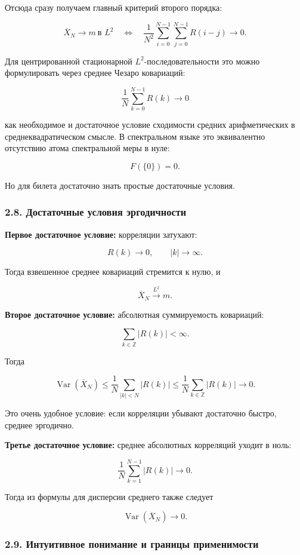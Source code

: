 \documentclass[
  11pt,
  a4paper,
]{article}
\begin{document}
Отсюда сразу получаем главный критерий второго порядка:

\[
\overline X_N\to m\ \text{в }L^2
\quad\Longleftrightarrow\quad
\frac1{N^2}
\sum_{i=0}^{N-1}\sum_{j=0}^{N-1}R(i-j)\to0.
\]

Для центрированной стационарной \(L^2\)-последовательности это можно
формулировать через среднее Чезаро ковариаций:

\[
\frac1N\sum_{k=0}^{N-1}R(k)\to0
\]

как необходимое и достаточное условие сходимости средних арифметических
в среднеквадратическом смысле. В спектральном языке это эквивалентно
отсутствию атома спектральной меры в нуле:

\[
F(\{0\})=0.
\]

Но для билета достаточно знать простые достаточные условия.

\subsubsection{2.8. Достаточные условия
эргодичности}\label{ux434ux43eux441ux442ux430ux442ux43eux447ux43dux44bux435-ux443ux441ux43bux43eux432ux438ux44f-ux44dux440ux433ux43eux434ux438ux447ux43dux43eux441ux442ux438}

\textbf{Первое достаточное условие:} корреляции затухают:

\[
R(k)\to0,
\qquad
|k|\to\infty.
\]

Тогда взвешенное среднее ковариаций стремится к нулю, и

\[
\overline X_N\xrightarrow{L^2}m.
\]

\textbf{Второе достаточное условие:} абсолютная суммируемость
ковариаций:

\[
\sum_{k\in\mathbb Z}|R(k)|<\infty.
\]

Тогда

\[
\operatorname{Var}(\overline X_N)
\le
\frac1N\sum_{|k|<N}|R(k)|
\le
\frac1N\sum_{k\in\mathbb Z}|R(k)|
\to0.
\]

Это очень удобное условие: если корреляции убывают достаточно быстро,
среднее эргодично.

\textbf{Третье достаточное условие:} среднее абсолютных корреляций
уходит в ноль:

\[
\frac1N\sum_{k=1}^{N-1}|R(k)|\to0.
\]

Тогда из формулы для дисперсии среднего также следует

\[
\operatorname{Var}(\overline X_N)\to0.
\]

\subsubsection{2.9. Интуитивное понимание и границы
применимости}\label{ux438ux43dux442ux443ux438ux442ux438ux432ux43dux43eux435-ux43fux43eux43dux438ux43cux430ux43dux438ux435-ux438-ux433ux440ux430ux43dux438ux446ux44b-ux43fux440ux438ux43cux435ux43dux438ux43cux43eux441ux442ux438}
\end{document}
